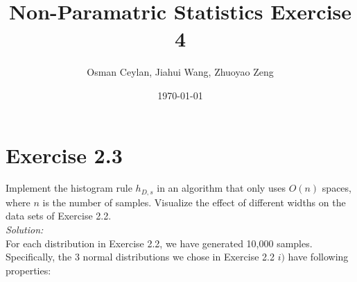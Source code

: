 \documentclass{article}
\title{Non-Paramatric Statistics Exercise 4}
\author{Osman Ceylan, Jiahui Wang, Zhuoyao Zeng}
\date{\today}
\begin{document}
\maketitle

\section*{Exercise 2.3} \vspace*{-1em}
Implement the histogram rule $h_{D,s}$ in an algorithm that only uses $O(n)$ spaces, where $n$ is the number of samples. Visualize the effect of different widths on the data sets of Exercise 2.2.\\
\textit{Solution: }\\
For each distribution in Exercise 2.2, we have generated 10,000 samples.\\ 
Specifically, the 3 normal distributions we chose in Exercise 2.2 $i)$ have following properties: \\
\end{document}
